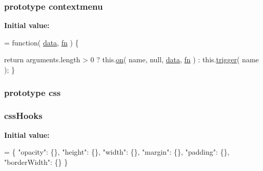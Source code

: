 \subsubsection[{contextmenu}]{ {\bf prototype} contextmenu}\label{jquery-1_810_82-vsdoc_8js_afb948baf7821b3f288133d6f9b8da16d}
{\bfseries Initial value\+:}
\begin{DoxyCode}
= \textcolor{keyword}{function}( \hyperlink{jquery-1_810_82-vsdoc_8js_a609407b3456fdc3c5671a9fc4a226ff7}{data}, \hyperlink{jquery-1_810_82-vsdoc_8js_acef6bdaf6b9b20fdcca1ea86f0902c3b}{fn} ) \{

        \textcolor{keywordflow}{return} arguments.length > 0 ?
            this.\hyperlink{jquery-1_810_82-vsdoc_8js_ae453b412b883f60220d73468ef6c6dbc}{on}( name, null, \hyperlink{jquery-1_810_82-vsdoc_8js_a609407b3456fdc3c5671a9fc4a226ff7}{data}, \hyperlink{jquery-1_810_82-vsdoc_8js_acef6bdaf6b9b20fdcca1ea86f0902c3b}{fn} ) :
            this.\hyperlink{jquery-1_810_82-vsdoc_8js_a2388c4114d5e3e4eab020f973641519c}{trigger}( name );
    \}
\end{DoxyCode}
\hypertarget{jquery-1_810_82-vsdoc_8js_aa8c6af259210b33d20642f8ee70cbfa4}{}
\subsubsection[{css}]{ {\bf prototype} css}\label{jquery-1_810_82-vsdoc_8js_aa8c6af259210b33d20642f8ee70cbfa4}
\hypertarget{jquery-1_810_82-vsdoc_8js_a9966a63bdc4e33753dbe36a83e7f96bf}{}
\subsubsection[{css\+Hooks}]{ css\+Hooks}\label{jquery-1_810_82-vsdoc_8js_a9966a63bdc4e33753dbe36a83e7f96bf}
{\bfseries Initial value\+:}
\begin{DoxyCode}
= \{ \textcolor{stringliteral}{"opacity"}: \{\},
\textcolor{stringliteral}{"height"}: \{\},
\textcolor{stringliteral}{"width"}: \{\},
\textcolor{stringliteral}{"margin"}: \{\},
\textcolor{stringliteral}{"padding"}: \{\},
\textcolor{stringliteral}{"borderWidth"}: \{\} \}
\end{DoxyCode}
\hypertarget{jquery-1_810_82-vsdoc_8js_ac1d75df6fff702cd103f92cce26e1b29}{}
